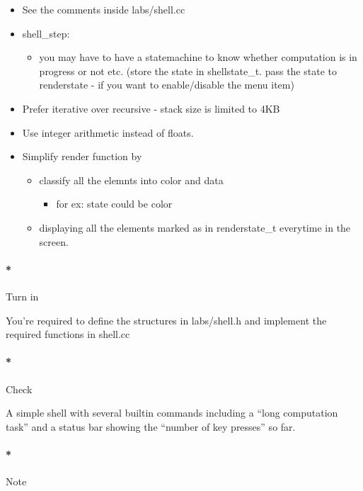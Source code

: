 \documentclass[]{article}
\providecommand{\tightlist}{%
  \setlength{\itemsep}{0pt}\setlength{\parskip}{0pt}}
\let\oldparagraph\paragraph
\renewcommand{\paragraph}[1]{\oldparagraph{#1}\mbox{}}
\begin{document}
\begin{itemize}
\item
  See the comments inside labs/shell.cc
\item
  shell\_step:

  \begin{itemize}
  \tightlist
  \item
    you may have to have a statemachine to know whether computation is
    in progress or not etc. (store the state in shellstate\_t. pass the
    state to renderstate - if you want to enable/disable the menu item)
  \end{itemize}
\item
  Prefer iterative over recursive - stack size is limited to 4KB
\item
  Use integer arithmetic instead of floats.
\item
  Simplify render function by

  \begin{itemize}
  \tightlist
  \item
    classify all the elemnts into color and data

    \begin{itemize}
    \tightlist
    \item
      for ex: state could be color
    \end{itemize}
  \item
    displaying all the elements marked as in renderstate\_t everytime in
    the screen.
  \end{itemize}
\end{itemize}

\paragraph*{Turn in}\label{turn-in-3}

You're required to define the structures in labs/shell.h and implement
the required functions in shell.cc

\paragraph*{Check}\label{check-3}

A simple shell with several builtin commands including a ``long
computation task'' and a status bar showing the ``number of key
presses'' so far.

\paragraph*{Note}\label{note-4}
\end{document}
